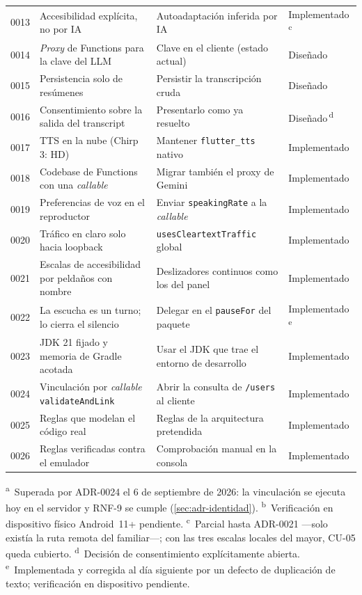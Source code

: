 \begin{longtable}{@{}l >{\RaggedRight\arraybackslash}p{} >{\RaggedRight\arraybackslash}p{} l@{}}
0013 & Accesibilidad explícita, no por IA & Autoadaptación inferida por IA          & Implementado\,\textsuperscript{c} \\
0014 & \emph{Proxy} de Functions para la clave del LLM & Clave en el cliente (estado actual) & Diseñado \\
0015 & Persistencia solo de resúmenes     & Persistir la transcripción cruda        & Diseñado \\
0016 & Consentimiento sobre la salida del transcript & Presentarlo como ya resuelto & Diseñado\,\textsuperscript{d} \\
0017 & TTS en la nube (Chirp 3: HD)       & Mantener \texttt{flutter\_tts} nativo   & Implementado \\
0018 & Codebase de Functions con una \emph{callable} & Migrar también el proxy de Gemini & Implementado \\
0019 & Preferencias de voz en el reproductor & Enviar \texttt{speakingRate} a la \emph{callable} & Implementado \\
0020 & Tráfico en claro solo hacia loopback & \texttt{usesCleartextTraffic} global   & Implementado \\
0021 & Escalas de accesibilidad por peldaños con nombre & Deslizadores continuos como los del panel & Implementado \\
0022 & La escucha es un turno; lo cierra el silencio & Delegar en el \texttt{pauseFor} del paquete & Implementado\,\textsuperscript{e} \\
0023 & JDK 21 fijado y memoria de Gradle acotada & Usar el JDK que trae el entorno de desarrollo & Implementado \\
0024 & Vinculación por \emph{callable} \texttt{validateAndLink} & Abrir la consulta de \texttt{/users} al cliente & Implementado \\
0025 & Reglas que modelan el código real & Reglas de la arquitectura pretendida & Implementado \\
0026 & Reglas verificadas contra el emulador & Comprobación manual en la consola & Implementado \\
\end{longtable}

\noindent\footnotesize
\textsuperscript{a}~Superada por ADR-0024 el 6 de septiembre de 2026: la vinculación se ejecuta hoy en el
servidor y RNF-9 se cumple (\autoref{sec:adr-identidad}).
\textsuperscript{b}~Verificación en dispositivo físico Android~11+ pendiente.
\textsuperscript{c}~Parcial hasta ADR-0021 ---solo existía la ruta remota del familiar---; con las tres
escalas locales del mayor, CU-05 queda cubierto.
\textsuperscript{d}~Decisión de consentimiento explícitamente abierta.
\textsuperscript{e}~Implementada y corregida al día siguiente por un defecto de duplicación de texto;
verificación en dispositivo pendiente.
\normalsize

